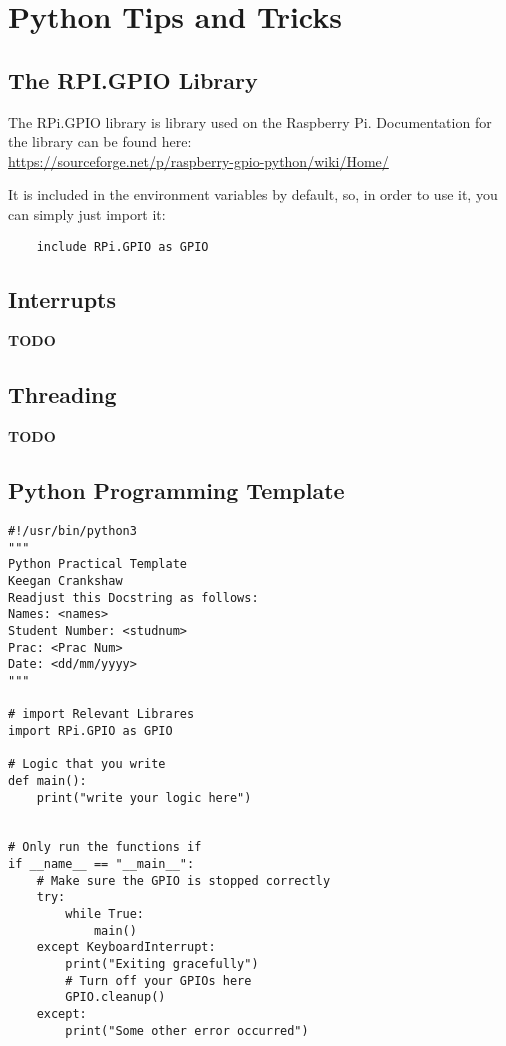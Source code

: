 \section{Python Tips and Tricks}

\subsection{The RPI.GPIO Library}
The RPi.GPIO library is library used on the Raspberry Pi. 
Documentation for the library can be found here:\\
\href{https://sourceforge.net/p/raspberry-gpio-python/wiki/Home/}{https://sourceforge.net/p/raspberry-gpio-python/wiki/Home/}

It is included in the environment variables by default, so, in order to use it, you can simply just import it:

\begin{verbatim}
    include RPi.GPIO as GPIO
\end{verbatim}


\subsection{Interrupts}
\textbf{TODO}

\subsection{Threading}
\textbf{TODO}

\newpage
\subsection{Python Programming Template}
\begin{lstlisting}
#!/usr/bin/python3
"""
Python Practical Template
Keegan Crankshaw
Readjust this Docstring as follows:
Names: <names>
Student Number: <studnum>
Prac: <Prac Num>
Date: <dd/mm/yyyy>
"""

# import Relevant Librares
import RPi.GPIO as GPIO

# Logic that you write
def main():
    print("write your logic here")


# Only run the functions if 
if __name__ == "__main__":
	# Make sure the GPIO is stopped correctly
	try:
	    while True:
		    main()
	except KeyboardInterrupt:
		print("Exiting gracefully")
		# Turn off your GPIOs here
		GPIO.cleanup()
	except:
		print("Some other error occurred")

\end{lstlisting}